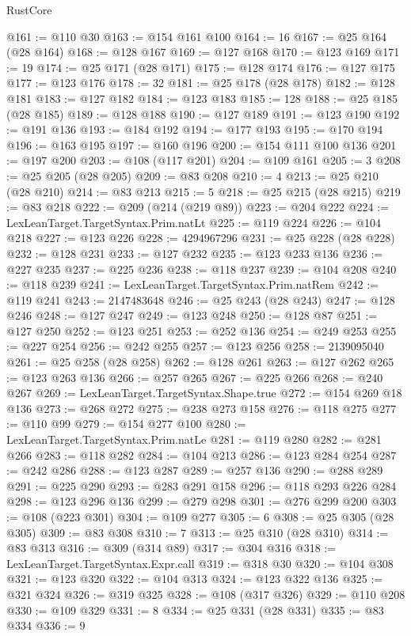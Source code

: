 \begin{lexlean}{RustCore}
\begin{coremodule}
@161 := @110 @30
@163 := @154 @161 @100
@164 := 16
@167 := @25 @164 (@28 @164)
@168 := @128 @167
@169 := @127 @168
@170 := @123 @169
@171 := 19
@174 := @25 @171 (@28 @171)
@175 := @128 @174
@176 := @127 @175
@177 := @123 @176
@178 := 32
@181 := @25 @178 (@28 @178)
@182 := @128 @181
@183 := @127 @182
@184 := @123 @183
@185 := 128
@188 := @25 @185 (@28 @185)
@189 := @128 @188
@190 := @127 @189
@191 := @123 @190
@192 := @191 @136
@193 := @184 @192
@194 := @177 @193
@195 := @170 @194
@196 := @163 @195
@197 := @160 @196
@200 := @154 @111 @100 @136
@201 := @197 @200
@203 := @108 (@117 @201)
@204 := @109 @161
@205 := 3
@208 := @25 @205 (@28 @205)
@209 := @83 @208
@210 := 4
@213 := @25 @210 (@28 @210)
@214 := @83 @213
@215 := 5
@218 := @25 @215 (@28 @215)
@219 := @83 @218
@222 := @209 (@214 (@219 @89))
@223 := @204 @222
@224 := LexLeanTarget.TargetSyntax.Prim.natLt
@225 := @119 @224
@226 := @104 @218
@227 := @123 @226
@228 := 4294967296
@231 := @25 @228 (@28 @228)
@232 := @128 @231
@233 := @127 @232
@235 := @123 @233 @136
@236 := @227 @235
@237 := @225 @236
@238 := @118 @237
@239 := @104 @208
@240 := @118 @239
@241 := LexLeanTarget.TargetSyntax.Prim.natRem
@242 := @119 @241
@243 := 2147483648
@246 := @25 @243 (@28 @243)
@247 := @128 @246
@248 := @127 @247
@249 := @123 @248
@250 := @128 @87
@251 := @127 @250
@252 := @123 @251
@253 := @252 @136
@254 := @249 @253
@255 := @227 @254
@256 := @242 @255
@257 := @123 @256
@258 := 2139095040
@261 := @25 @258 (@28 @258)
@262 := @128 @261
@263 := @127 @262
@265 := @123 @263 @136
@266 := @257 @265
@267 := @225 @266
@268 := @240 @267
@269 := LexLeanTarget.TargetSyntax.Shape.true
@272 := @154 @269 @18 @136
@273 := @268 @272
@275 := @238 @273 @158
@276 := @118 @275
@277 := @110 @99
@279 := @154 @277 @100
@280 := LexLeanTarget.TargetSyntax.Prim.natLe
@281 := @119 @280
@282 := @281 @266
@283 := @118 @282
@284 := @104 @213
@286 := @123 @284 @254
@287 := @242 @286
@288 := @123 @287
@289 := @257 @136
@290 := @288 @289
@291 := @225 @290
@293 := @283 @291 @158
@296 := @118 @293 @226 @284
@298 := @123 @296 @136
@299 := @279 @298
@301 := @276 @299 @200
@303 := @108 (@223 @301)
@304 := @109 @277
@305 := 6
@308 := @25 @305 (@28 @305)
@309 := @83 @308
@310 := 7
@313 := @25 @310 (@28 @310)
@314 := @83 @313
@316 := @309 (@314 @89)
@317 := @304 @316
@318 := LexLeanTarget.TargetSyntax.Expr.call
@319 := @318 @30
@320 := @104 @308
@321 := @123 @320
@322 := @104 @313
@324 := @123 @322 @136
@325 := @321 @324
@326 := @319 @325
@328 := @108 (@317 @326)
@329 := @110 @208
@330 := @109 @329
@331 := 8
@334 := @25 @331 (@28 @331)
@335 := @83 @334
@336 := 9

\end{coremodule}
\end{lexlean}
